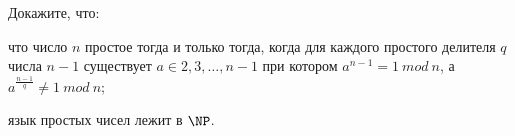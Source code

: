 Докажите, что:
\begin{enumcyr}
    \item что число $n$ простое тогда и только тогда, когда для каждого простого делителя $q$ числа $n -
    	1$ существует $a \in {2, 3, \dots, n - 1}$ при котором $a^{n - 1} = 1~mod~n$, а
	    $a^{\frac{n - 1}{q}} \ne 1~mod~n$;
    \item язык простых чисел лежит в $\NP$.
\end{enumcyr}

